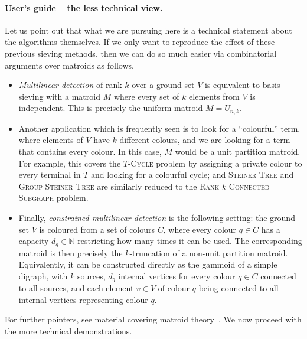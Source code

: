 \documentclass[10pt,a4paper]{article}
\newcommand{\N}{\ensuremath{\mathbb N}\xspace}
\begin{document}
\paragraph{User's guide -- the less technical view.}
Let us point out that what we are pursuing here is a technical statement
about the algorithms themselves. If we only want to reproduce
the effect of these previous sieving methods, then we can do so
much easier via combinatorial arguments over matroids as follows.
\begin{itemize}
\item \emph{Multilinear detection} of rank $k$ over a ground set $V$
  is equivalent to basis sieving with a matroid $M$ where every set of
  $k$ elements from $V$ is independent. This is precisely the uniform matroid $M=U_{n,k}$.
\item Another application which is frequently seen is to look for a ``colourful''
  term, where elements of $V$ have $k$ different colours, and we are looking for
  a term that contains every colour. In this case, $M$ would be a unit partition matroid. 
  For example, this covers the \textsc{$T$-Cycle} problem by assigning a private
  colour to every terminal in $T$ and looking for a colourful cycle;
  and \textsc{Steiner Tree} and \textsc{Group Steiner Tree}
  are similarly reduced to the \textsc{Rank $k$ Connected Subgraph} problem.
\item Finally, \emph{constrained multilinear detection} is the following setting:
  the ground set $V$ is coloured from a set of colours $C$, where every colour $q \in C$
  has a capacity $d_q \in \N$ restricting how many times it can be used.
  The corresponding matroid is then precisely the $k$-truncation of a non-unit partition matroid.
  Equivalently, it can be constructed directly as the gammoid of a simple digraph,
  with $k$ sources, $d_q$ internal vertices for every colour $q \in C$ connected to all sources,
  and each element $v \in V$ of colour $q$ being connected to all internal vertices representing colour $q$.
\end{itemize}
For further pointers, see material covering matroid theory~\cite{OxleyBook,Marx09-matroid,Schrijver}.
We now proceed with the more technical demonstrations.
\end{document}
